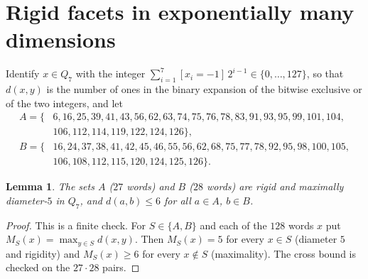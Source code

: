 \documentclass[11pt]{amsart}
\newtheorem{lemma}[theorem]{Lemma}
\theoremstyle{remark}
\begin{document}
\section{Rigid facets in exponentially many dimensions}\label{sec:dims}

Identify $x\in Q_7$ with the integer $\sum_{i=1}^7[x_i=-1]\,2^{i-1}\in\{0,\dots,127\}$, so that $d(x,y)$ is the number
of ones in the binary expansion of the bitwise exclusive or of the two integers, and let
\begin{align*}
A=\{&6,16,25,39,41,43,56,62,63,74,75,76,78,83,91,93,95,99,101,104,\\
&106,112,114,119,122,124,126\},\\
B=\{&16,24,37,38,41,42,45,46,55,56,62,68,75,77,78,92,95,98,100,105,\\
&106,108,112,115,120,124,125,126\}.
\end{align*}

\begin{lemma}\label{lem:AB}
The sets $A$ ($27$ words) and $B$ ($28$ words) are rigid and maximally diameter-$5$ in $Q_7$, and
$d(a,b)\le6$ for all $a\in A$, $b\in B$.
\end{lemma}

\begin{proof}
This is a finite check. For $S\in\{A,B\}$ and each of the $128$ words $x$ put $M_S(x)=\max_{y\in S}d(x,y)$. Then
$M_S(x)=5$ for every $x\in S$ (diameter $5$ and rigidity) and $M_S(x)\ge6$ for every $x\notin S$ (maximality). The
cross bound is checked on the $27\cdot28$ pairs.
\end{proof}
\end{document}
